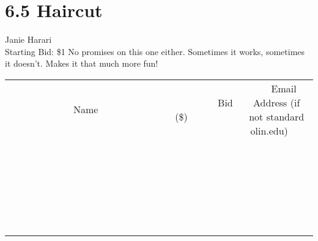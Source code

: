 \documentclass[11pt]{article}
\begin{document}
\section*{6.5 Haircut}
Janie Harari
\\
Starting Bid: \$1
\newline
No promises on this one either.  Sometimes it works, sometimes it doesn't.  Makes it that much more fun!
\\[6ex]
\begin{tabular}{c c c}
~~~~~~~~~~~~~Name~~~~~~~~~~~~~ & ~~~~~~~~~Bid (\$)~~~~~~~~~  & ~~~Email Address (if not standard olin.edu)~~~\\
 & & \\
\hline
 & & \\
\hline
 & & \\
\hline
 & & \\
\hline
 & & \\
\hline
 & & \\
\hline
 & & \\
\hline
 & & \\
\hline
 & & \\
\hline
 & & \\
\hline
 & & \\
\hline
 & & \\
\hline
 & & \\
\hline
 & & \\
\hline
 & & \\
\hline
 & & \\
\hline
 & & \\
\hline
 & & \\
\hline
 & & \\
\hline
 & & \\
\hline
 & & \\
\hline
 & & \\
\hline
 & & \\
\hline
 & & \\
\hline
 & & \\
\hline
 & & \\
\hline
\end{tabular}
\newpage
\end{document}
